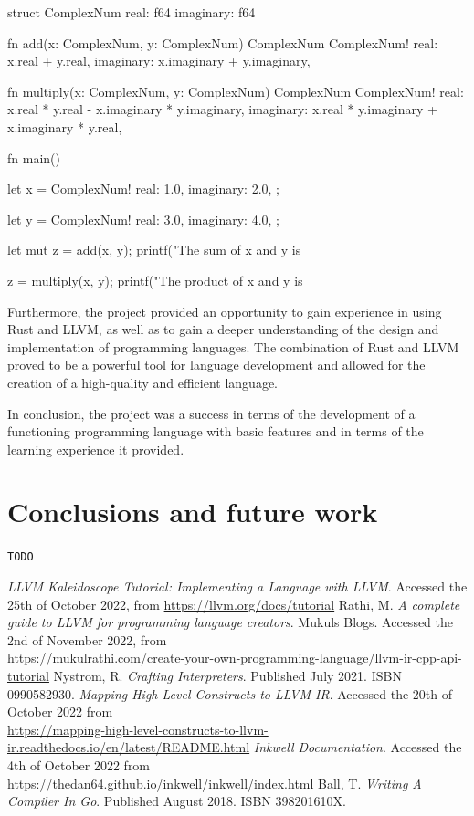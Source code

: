 ﻿\documentclass[10pt,a4paper,twocolumn,twoside]{article}
\begin{document}
\begin{code}
struct ComplexNum {
    real:      f64
    imaginary: f64
}

fn add(x: ComplexNum, y: ComplexNum) ComplexNum {
    ComplexNum!{
        real: x.real + y.real,
        imaginary: x.imaginary + y.imaginary,
    }
}

fn multiply(x: ComplexNum, y: ComplexNum) ComplexNum {
    ComplexNum!{
        real: x.real * y.real - x.imaginary * y.imaginary,
        imaginary: x.real * y.imaginary + x.imaginary * y.real,
    }
}

fn main() {
    let x = ComplexNum!{ 
        real: 1.0,
        imaginary: 2.0,
    };

    let y = ComplexNum!{ 
        real: 3.0,
        imaginary: 4.0,
    };

    let mut z = add(x, y);
    printf("The sum of x and y is %

    z = multiply(x, y);
    printf("The product of x and y is %
}
\end{code}

Furthermore, the project provided an opportunity to gain experience in using
Rust and LLVM, as well as to gain a deeper understanding of the design and
implementation of programming languages. The combination of Rust and LLVM proved
to be a powerful tool for language development and allowed for the creation of a
high-quality and efficient language.

In conclusion, the project was a success in terms of the development of a
functioning programming language with basic features and in terms of the
learning experience it provided.

\section{Conclusions and future work}
\texttt{TODO}

\begin{thebibliography}{11}

 \textit{LLVM Kaleidoscope Tutorial: Implementing a Language with LLVM}. Accessed the 25th of October 2022, from \url{https://llvm.org/docs/tutorial}
 Rathi, M. \textit{A complete guide to LLVM for programming language creators}. Mukuls Blogs. Accessed the 2nd of November 2022, from \\\url{https://mukulrathi.com/create-your-own-programming-language/llvm-ir-cpp-api-tutorial}
 Nystrom, R. \textit{Crafting Interpreters}. Published July 2021. ISBN 0990582930.
 \textit{Mapping High Level Constructs to LLVM IR}. Accessed the 20th of October 2022 from \\\url{https://mapping-high-level-constructs-to-llvm-ir.readthedocs.io/en/latest/README.html}
 \textit{Inkwell Documentation}. Accessed the 4th of October 2022 from \\\url{https://thedan64.github.io/inkwell/inkwell/index.html}
 Ball, T. \textit{Writing A Compiler In Go}. Published August 2018. ISBN 398201610X.

\end{thebibliography}
\end{document}
